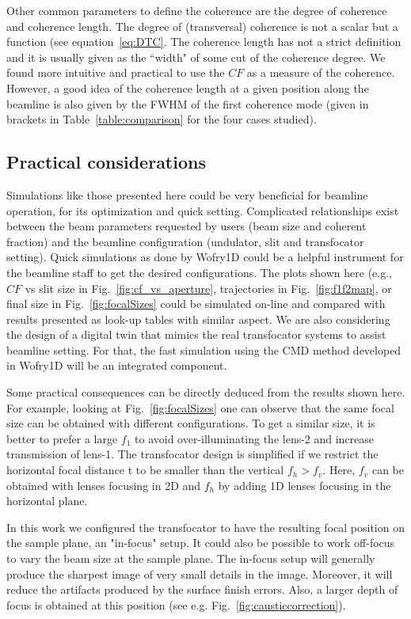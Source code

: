 \documentclass{iucr}              %
\begin{document}
Other common parameters to define the coherence are the degree of coherence and coherence length. The degree of (transversal) coherence is not a scalar but a function (see equation~\ref{eq:DTC}. The coherence length has not a strict definition and it is usually given as the ``width" of some cut of the coherence degree. We found more intuitive and practical to use the $CF$ as a measure of the coherence. However, a good idea of the coherence length at a given position along the beamline is also given by the FWHM of the first coherence mode (given in brackets in Table~\ref{table:comparison} for the four cases studied).    


\subsection{Practical considerations} Simulations like those presented here could be very beneficial for beamline operation, for its optimization and quick setting.  Complicated  relationships exist between the beam parameters requested by users (beam size and coherent fraction) and the beamline configuration (undulator, slit and transfocator setting). Quick simulations as done by Wofry1D could be a helpful instrument for the beamline staff to get the desired configurations. The plots shown here (e.g., $CF$ vs slit size in Fig.~\ref{fig:cf_vs_aperture}, trajectories in Fig.~\ref{fig:f1f2map}, or final size in Fig.~\ref{fig:focalSizes} could be simulated on-line and compared with results presented as look-up tables with similar aspect. We are also considering the design of a digital twin that mimics the real transfocator systems to assist beamline setting. For that, the fast simulation using the CMD method developed in Wofry1D will be an integrated component.  

Some practical consequences can be directly deduced from the results shown here. For example, looking at Fig.~\ref{fig:focalSizes} one can observe that the same focal size can be obtained with different configurations. To get a similar size, it is better to prefer a large $f_1$ to avoid over-illuminating the lens-2 and increase transmission of lens-1. The transfocator design is simplified if we restrict the horizontal focal distance t to be smaller than the vertical $f_h>f_v$. Here, $f_v$ can be obtained with lenses focusing in 2D and $f_h$ by adding 1D lenses focusing in the horizontal plane. 

In this work we configured the transfocator to have the resulting focal position on the sample plane, an "in-focus" setup. It could also be possible to work off-focus to vary the beam size at the sample plane. The in-focus setup will generally produce the sharpest image of very small details in the image. Moreover, it will reduce the artifacts produced by the surface finish errors. Also, a larger depth of focus is obtained at this position (see e.g. Fig.~\ref{fig:causticcorrection}).
\end{document}
